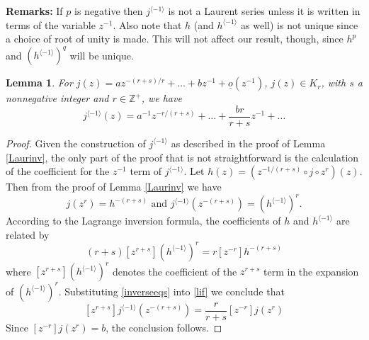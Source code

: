 \documentclass[11pt]{amsart}
\theoremstyle{theorem}
\theoremstyle{lemma}
\newtheorem{lemma}{Lemma}
\theoremstyle{corollary}
\theoremstyle{proposition}
\theoremstyle{definition}
\theoremstyle{remark}
\def\d{\displaystyle}
\begin{document}
\textbf{Remarks:}  If $p$ is negative then $j^{\langle -1 \rangle}$ is not a Laurent series unless it is written in terms of the variable $z^{-1}$.  Also note that $h$ (and $h^{\langle -1 \rangle}$ as well) is not unique  since a choice of root of unity is made.  This will not affect our result, though, since $h^p$ and $(h^{\langle -1 \rangle})^q$ will be unique.

\begin{lemma}\label{fgcoeffslemma}
	For $\d{j(z)=az^{-(r+s)/r}+\dots+bz^{-1}+\underline{o}(z^{-1})}$, $j(z)\in K_r$, with $s$ a nonnegative integer and $r\in\mathbb{Z}^+$, we have $$j^{\langle -1 \rangle}(z)=a^{-1}z^{-r/(r+s)}+\dots+\frac{br}{r+s}z^{-1}+\dots$$
\end{lemma}

\begin{proof}
	Given the construction of $j^{\langle -1 \rangle}$ as described in the proof of Lemma \ref{Laurinv}, the only part of the proof that is not straightforward is the calculation of the coefficient for the $z^{-1}$ term of $j^{\langle -1 \rangle}$.  Let $h(z) = (z^{-1/(r+s)}\circ j\circ z^r)(z)$.  Then from the proof of Lemma \ref{Laurinv} we have
\begin{equation}\label{inverseeqs}
	j(z^r)=h^{-(r+s)} \text{ and } j^{\langle -1 \rangle}(z^{-(r+s)})=(h^{\langle -1 \rangle})^r.
\end{equation}
According to the Lagrange inversion formula, the coefficients of $h$ and $h^{\langle -1 \rangle}$ are related by
\begin{equation}\label{lif}
	(r+s)[z^{r+s}](h^{\langle -1 \rangle})^r=r[z^{-r}]h^{-(r+s)}
\end{equation}
where $[z^{r+s}](h^{\langle -1 \rangle})^r$ denotes the coefficient of the $z^{r+s}$ term in the expansion of $(h^{\langle -1 \rangle})^r$.  Substituting \eqref{inverseeqs} into \eqref{lif} we conclude that
\begin{equation}\label{lifconc}
	[z^{r+s}]j^{\langle -1 \rangle}(z^{-(r+s)})=\frac{r}{r+s}[z^{-r}]j(z^r)
\end{equation}Since $[z^{-r}]j(z^r)=b$, the conclusion follows.
\end{proof}
\end{document}
